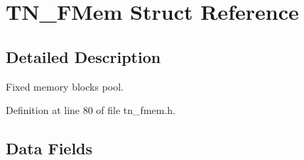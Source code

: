 \hypertarget{structTN__FMem}{}\section{T\+N\+\_\+\+F\+Mem Struct Reference}
\label{structTN__FMem}


\subsection{Detailed Description}
Fixed memory blocks pool. 

Definition at line 80 of file tn\+\_\+fmem.\+h.

\subsection*{Data Fields}
